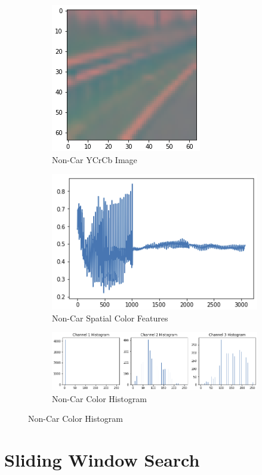 \documentclass[12pt]{article}
\begin{document}
\begin{figure}[!h]
\centering
\begin{subfigure}{0.495\textwidth}
\centering
\includegraphics[scale=0.5]{non_car_ycrcb.png}
\caption{Non-Car YCrCb Image}
\end{subfigure}
\begin{subfigure}{0.495\textwidth}
\centering
\includegraphics[scale=0.5]{non_car_spatial.png}
\caption{Non-Car Spatial Color Features}
\end{subfigure}
\begin{subfigure}{0.99\textwidth}
\centering
\includegraphics[scale=0.6]{non_car_color_hist.png}
\caption{Non-Car Color Histogram}
\end{subfigure}
\end{figure}

\vspace{30cm}
\section{Sliding Window Search}
\end{document}
